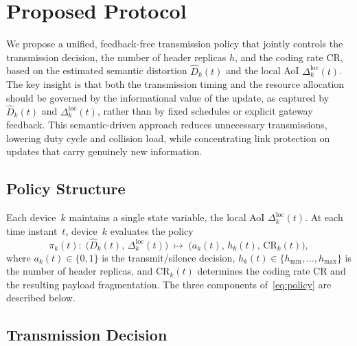 \documentclass[lettersize,journal]{IEEEtran}
\begin{document}
\section{Proposed Protocol}
\label{sec:protocol}

We propose a unified, feedback-free transmission policy that jointly controls the transmission decision, the number of header replicas $h$, and the coding rate $\mathrm{CR}$, based on the estimated semantic distortion $\hat{D}_k(t)$ and the local \ac{AoI} $\Delta_k^{\mathrm{loc}}(t)$. The key insight is that both the transmission timing and the resource allocation should be governed by the informational value of the update, as captured by $\hat{D}_k(t)$ and $\Delta_k^{\mathrm{loc}}(t)$, rather than by fixed schedules or explicit gateway feedback. This semantic-driven approach reduces unnecessary transmissions, lowering duty cycle and collision load, while concentrating link protection on updates that carry genuinely new information.

\subsection{Policy Structure}
\label{subsec:policy_overview}

Each device~$k$ maintains a single state variable, the local \ac{AoI} $\Delta_k^{\mathrm{loc}}(t)$. At each time instant~$t$, device~$k$ evaluates the policy
\begin{equation}
    \pi_k(t):\;
    \bigl(\hat{D}_k(t),\,\Delta_k^{\mathrm{loc}}(t)\bigr)
    \;\mapsto\;
    \bigl(a_k(t),\,h_k(t),\,\mathrm{CR}_k(t)\bigr),
    \label{eq:policy}
\end{equation}
where $a_k(t) \in \{0,1\}$ is the transmit/silence decision, $h_k(t) \in \{h_{\min},\ldots,h_{\max}\}$ is the number of header replicas, and $\mathrm{CR}_k(t)$ determines the coding rate $\mathrm{CR}$ and the resulting payload fragmentation. The three components of~\eqref{eq:policy} are described below.

\subsection{Transmission Decision}
\label{subsec:trigger}
\end{document}

